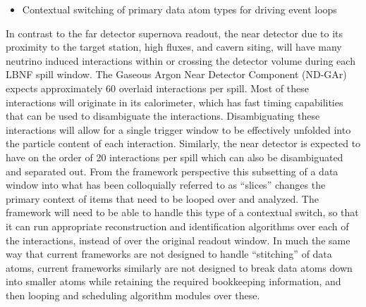 \documentclass[../main-v1.tex]{subfiles}
\begin{document}

\begin{itemize}
\item Contextual switching of primary data atom types for driving event loops
\end{itemize}
  
  In contrast to the far detector supernova readout, the  near detector due to its proximity to the target station, high fluxes, and cavern siting, will have many neutrino induced interactions within or crossing the detector volume during each LBNF spill window.  The Gaseous Argon Near Detector Component (ND-GAr) expects approximately 60 overlaid interactions per spill.  Most of these interactions will originate in its calorimeter, which has fast timing capabilities that can be used to disambiguate the interactions.  Disambiguating these interactions will allow for a single trigger window to be effectively unfolded into the particle content of each interaction.  Similarly, the  near detector is expected to have on the order of 20 interactions per spill which can also be disambiguated and separated out.  From the framework perspective this subsetting of a data window into what has been colloquially referred to as ``slices'' changes the primary context of items that need to be looped over and analyzed.  The  framework will need to be able to handle this type of a contextual switch, so that it can run appropriate reconstruction and identification algorithms over each of the interactions, instead of over the original readout window.  In much the same way that current frameworks are not designed to handle ``stitching'' of data atoms, current frameworks similarly are not designed to break data atoms down into smaller atoms while retaining the required bookkeeping information, and then looping and scheduling algorithm modules over these.

\end{document}
